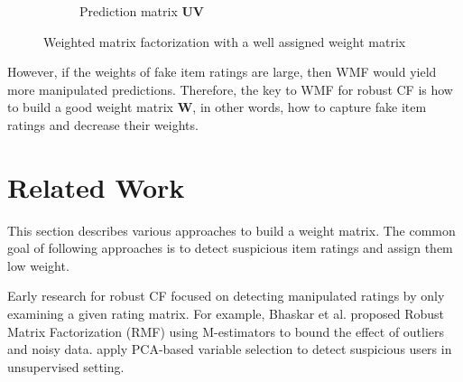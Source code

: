 \documentclass[master,english,final]{kaist-ucs}
\begin{document}
\begin{figure}[h]
\begin{subfigure}[b]{0.3\textwidth}
        \caption{Prediction matrix $\bm{UV}$}
        \label{wmf_good_prediction}
    \end{subfigure}
    \caption{Weighted matrix factorization with a well assigned weight matrix}
    \label{wmf_good}
\end{figure}


However, if the weights of fake item ratings are large, then WMF would yield more manipulated predictions.
Therefore, the key to WMF for robust CF is how to build a good weight matrix $\bm{W}$, in other words, how to capture fake item ratings and decrease their weights.



\chapter{Related Work}
This section describes various approaches to build a weight matrix.
The common goal of following approaches is to detect suspicious item ratings and assign them low weight.


Early research for robust CF focused on detecting manipulated ratings by only examining a given rating matrix.
For example, Bhaskar et al. \cite{RMF} proposed Robust Matrix Factorization (RMF) using M-estimators to bound the effect of outliers and noisy data.
\cite{LiesAndPropaganda,UnsupervisedShilling,AttackResistant} apply PCA-based variable selection to detect suspicious users in unsupervised setting.
\end{document}
